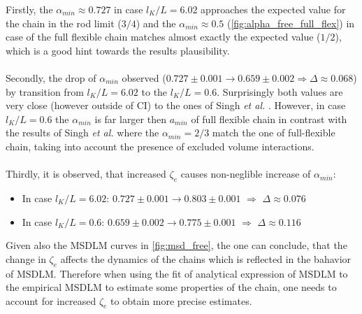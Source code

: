 \documentclass[
    paper=A4,pagesize=automedia,fontsize=12pt,
    BCOR=15mm,DIV=22,
    twoside,headinclude,footinclude=false,
    fleqn,             %
    bibliography=totocnumbered,          %
    listof=totoc,                %
    listof=flat,                 %
    cleardoublepage=empty      %
    numbers=endperiod
]{scrartcl}
\begin{document}
Firstly, the $\alpha_{min} \approx 0.727$
in case $l_K/L=6.02$ approaches the expected value for the chain in the rod limit ($3/4$) 
and the $\alpha_{min} \approx 0.5$ (\autoref{fig:alpha_free_full_flex}) in 
case of the full flexible chain matches  almost exactly the expected value 
($1/2$), which is a good hint towards the results plausibility.
\\
\\
Secondly, the drop of $\alpha_{min}$ observed 
($0.727\pm0.001 \rightarrow 0.659\pm0.002 \Rightarrow \Delta\approx0.068$) by transition from $l_K/L=6.02$
to the $l_K/L=0.6$. 
Surprisingly both values are very close (however outside of CI) to the ones
of Singh \emph{et al.} \cite{Singh:2022}.
However, in case $l_K/L=0.6$ the $\alpha_{min}$ is 
far larger then $a_{min}$ of full flexible chain in contrast with the results
of Singh \emph{et al.} \cite{Singh:2022} where the $\alpha_{min}=2/3$ match 
the one of full-flexible chain, taking into account the presence of 
excluded volume interactions.
\\
\\
Thirdly, it is observed, that 
increased $\zeta_e$ causes non-neglible increase of $\alpha_{min}$:
\begin{itemize}
    \item In case $l_K/L=6.02$: $0.727 \pm 0.001 \rightarrow 0.803 \pm 0.001$ $\Rightarrow$ $\Delta\approx0.076$
    \item In case $l_K/L=0.6$: $0.659 \pm 0.002 \rightarrow 0.775 \pm 0.001$ $\Rightarrow$ $\Delta\approx0.116$
\end{itemize}
Given also the MSDLM curves in \autoref{fig:msd_free}, the one can conclude,
that the change in $\zeta_e$ affects the dynamics of the chains which is reflected in
the bahavior of MSDLM. Therefore when using the fit of analytical expression of MSDLM
to the empirical MSDLM to estimate some properties of the chain, one needs to account
for increased $\zeta_e$ to obtain more precise estimates.
\end{document}
